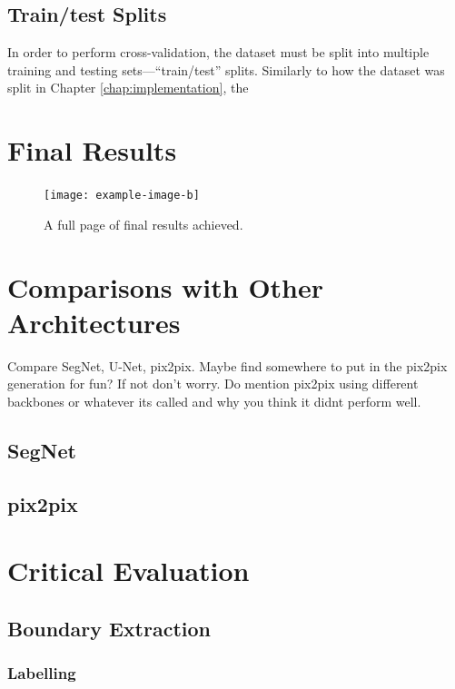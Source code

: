 \subsection{Train/test Splits}

In order to perform cross-validation, the dataset must be split into multiple training and testing sets---``train/test'' splits. Similarly to how the dataset was split in Chapter \ref{chap:implementation}, the

\section{Final Results}

\begin{figure}[!p]
    \centering
    \texttt{[image: example-image-b]}
    \caption{A full page of final results achieved.}
    \label{fig:finalresults}
\end{figure}

\section{Comparisons with Other Architectures}

Compare SegNet, U-Net, pix2pix. Maybe find somewhere to put in the pix2pix generation for fun? If not don't worry. Do mention pix2pix using different backbones or whatever its called and why you think it didnt perform well.

\subsection{SegNet}

\subsection{pix2pix}



\section{Critical Evaluation}

\subsection{Boundary Extraction}

\subsubsection{Labelling}

